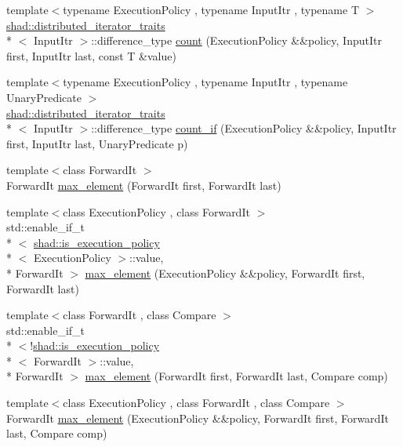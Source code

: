 \begin{DoxyCompactItemize}
\item 
{\footnotesize template$<$typename Execution\-Policy , typename Input\-Itr , typename T $>$ }\\\hyperlink{structshad_1_1distributed__iterator__traits}{shad\-::distributed\-\_\-iterator\-\_\-traits}\\*
$<$ Input\-Itr $>$\-::difference\-\_\-type \hyperlink{namespaceshad_a2abc6976d67b071eccbb8d17e9a602fe}{count} (Execution\-Policy \&\&policy, Input\-Itr first, Input\-Itr last, const T \&value)
\item 
{\footnotesize template$<$typename Execution\-Policy , typename Input\-Itr , typename Unary\-Predicate $>$ }\\\hyperlink{structshad_1_1distributed__iterator__traits}{shad\-::distributed\-\_\-iterator\-\_\-traits}\\*
$<$ Input\-Itr $>$\-::difference\-\_\-type \hyperlink{namespaceshad_a08f4233aef9435fb627ebb82d186715e}{count\-\_\-if} (Execution\-Policy \&\&policy, Input\-Itr first, Input\-Itr last, Unary\-Predicate p)
\item 
{\footnotesize template$<$class Forward\-It $>$ }\\Forward\-It \hyperlink{namespaceshad_a81976ee44edd512260a625c628f6094b}{max\-\_\-element} (Forward\-It first, Forward\-It last)
\item 
{\footnotesize template$<$class Execution\-Policy , class Forward\-It $>$ }\\std\-::enable\-\_\-if\-\_\-t\\*
$<$ \hyperlink{structshad_1_1is__execution__policy}{shad\-::is\-\_\-execution\-\_\-policy}\\*
$<$ Execution\-Policy $>$\-::value, \\*
Forward\-It $>$ \hyperlink{namespaceshad_a3f4b06918fc7b1425c9bc8aa942d894d}{max\-\_\-element} (Execution\-Policy \&\&policy, Forward\-It first, Forward\-It last)
\item 
{\footnotesize template$<$class Forward\-It , class Compare $>$ }\\std\-::enable\-\_\-if\-\_\-t\\*
$<$!\hyperlink{structshad_1_1is__execution__policy}{shad\-::is\-\_\-execution\-\_\-policy}\\*
$<$ Forward\-It $>$\-::value, \\*
Forward\-It $>$ \hyperlink{namespaceshad_aceab28870f92123bc4489897c5e7d640}{max\-\_\-element} (Forward\-It first, Forward\-It last, Compare comp)
\item 
{\footnotesize template$<$class Execution\-Policy , class Forward\-It , class Compare $>$ }\\Forward\-It \hyperlink{namespaceshad_a507fdc64c5881f464e3c6dd7e470bfa1}{max\-\_\-element} (Execution\-Policy \&\&policy, Forward\-It first, Forward\-It last, Compare comp)

\end{DoxyCompactItemize}
